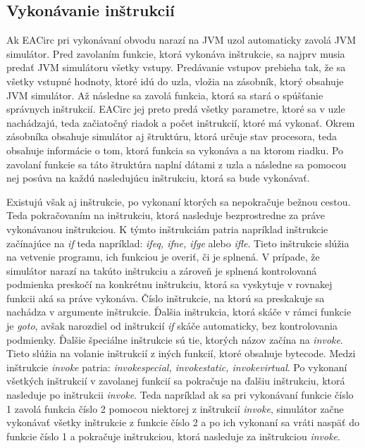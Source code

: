 \subsection{Vykonávanie inštrukcií} 
\label{subsec:emulating-ins}

Ak EACirc pri vykonávaní obvodu narazí na JVM uzol automaticky zavolá JVM simulátor. Pred zavolaním funkcie, ktorá vykonáva inštrukcie, sa najprv musia predať JVM simulátoru všetky vstupy. Predávanie vstupov prebieha tak, že sa všetky vstupné hodnoty, ktoré idú do uzla, vložia na zásobník, ktorý obsahuje JVM simulátor. Až následne sa zavolá funkcia, ktorá sa stará o spúšťanie správnych inštrukcií. EACirc jej preto predá všetky parametre, ktoré sa v uzle nachádzajú, teda začiatočný riadok a počet inštrukcií, ktoré má vykonať. Okrem zásobníka obsahuje simulátor aj štruktúru, ktorá určuje stav procesora, teda obsahuje informácie o tom, ktorá funkcia sa vykonáva a na ktorom riadku. Po zavolaní funkcie sa táto štruktúra naplní dátami z uzla a následne sa pomocou nej posúva na každú nasledujúcu inštrukciu, ktorá sa bude vykonávať.

Existujú však aj inštrukcie, po vykonaní ktorých sa nepokračuje bežnou cestou. Teda pokračovaním na inštrukciu, ktorá nasleduje bezprostredne za práve vykonávanou inštrukciou. K týmto inštrukciám patria napríklad inštrukcie začínajúce na \textit{if} teda napríklad: \textit{ifeq, ifne, ifge} alebo \textit{ifle}. Tieto inštrukcie slúžia na vetvenie programu, ich funkciou je overiť, či je splnená. V prípade, že simulátor narazí na takúto inštrukciu a zároveň je splnená kontrolovaná podmienka preskočí na konkrétnu inštrukciu, ktorá sa vyskytuje v rovnakej funkcii aká sa práve vykonáva. Číslo inštrukcie, na ktorú sa preskakuje sa nachádza v argumente inštrukcie. Ďalšia inštrukcia, ktorá skáče v rámci funkcie je \textit{goto}, avšak narozdiel od inštrukcií \textit{if} skáče automaticky, bez kontrolovania podmienky. Ďalšie špeciálne inštrukcie sú tie, ktorých názov začína na \textit{invoke}. Tieto slúžia na volanie inštrukcií z iných funkcií, ktoré obsahuje bytecode. Medzi inštrukcie \textit{invoke} patria: \textit{invokespecial, invokestatic, invokevirtual}. Po vykonaní všetkých inštrukcií v zavolanej funkcií sa pokračuje na ďalšiu inštrukciu, ktorá nasleduje po inštrukcii \textit{invoke}. Teda napríklad ak sa pri vykonávaní funkcie číslo 1 zavolá funkcia číslo 2 pomocou niektorej z inštrukcií \textit{invoke}, simulátor začne vykonávať všetky inštrukcie z funkcie číslo 2 a po ich vykonaní sa vráti naspäť do funkcie číslo 1 a pokračuje inštrukciou, ktorá nasleduje za inštrukciou \textit{invoke}.

